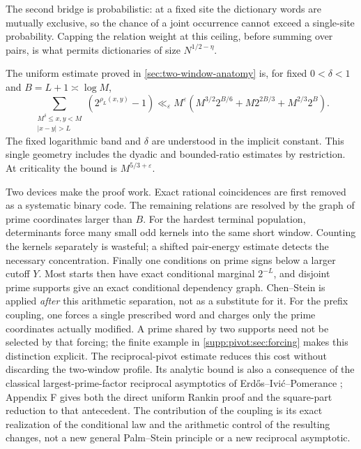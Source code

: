 The second bridge is probabilistic: at a fixed site the dictionary words are
mutually exclusive, so the chance of a joint occurrence cannot exceed a
single-site probability. Capping the relation weight at this ceiling,
before summing over pairs, is what permits dictionaries of size
$N^{1/2-\eta}$.

The uniform estimate proved in \cref{sec:two-window-anatomy} is, for fixed
$0<\delta<1$ and $B=L+1\asymp\log M$,
\begin{equation}\label{eq:intro-master-profile}
 \sum_{\substack{M^\delta\le x,y<M\\|x-y|>L}}
 (2^{\rho_L(x,y)}-1)
 \ll_\varepsilon M^\varepsilon
 \left(M^{3/2}2^{B/6}+M2^{2B/3}+M^{2/3}2^B\right).
\end{equation}
The fixed logarithmic band and $\delta$ are understood in the implicit
constant. This single geometry includes the dyadic and bounded-ratio
estimates by restriction. At criticality the bound is $M^{5/3+\varepsilon}$.

Two devices make the proof work. Exact rational coincidences are first
removed as a systematic binary code. The remaining relations are resolved
by the graph of prime coordinates larger than $B$. For the hardest terminal
population, determinants force many small odd kernels into the same short
window. Counting the kernels separately is wasteful; a shifted pair-energy
estimate detects the necessary concentration. Finally one conditions on
prime signs below a larger cutoff $Y$. Most starts then have exact
conditional marginal $2^{-L}$, and disjoint prime supports give an exact
conditional dependency graph. Chen--Stein is applied \emph{after} this
arithmetic separation, not as a substitute for it. For the prefix coupling,
one forces a single prescribed word and charges only the prime coordinates
actually modified. A prime shared by two supports need not be selected by
that forcing; the finite example in \cref{supp:pivot:sec:forcing} makes
this distinction explicit. The reciprocal-pivot estimate reduces this
cost without discarding the two-window profile. Its analytic bound is
also a consequence of the classical largest-prime-factor reciprocal
asymptotics of Erd\H{o}s--Ivi\'c--Pomerance
\cite{ErdosIvicPomerance1986}; Appendix F gives both the direct uniform
Rankin proof and the square-part reduction to that antecedent.
The contribution of the coupling is its exact realization of the
conditional law and the arithmetic control of the resulting changes,
not a new general Palm--Stein principle or a new reciprocal asymptotic.



